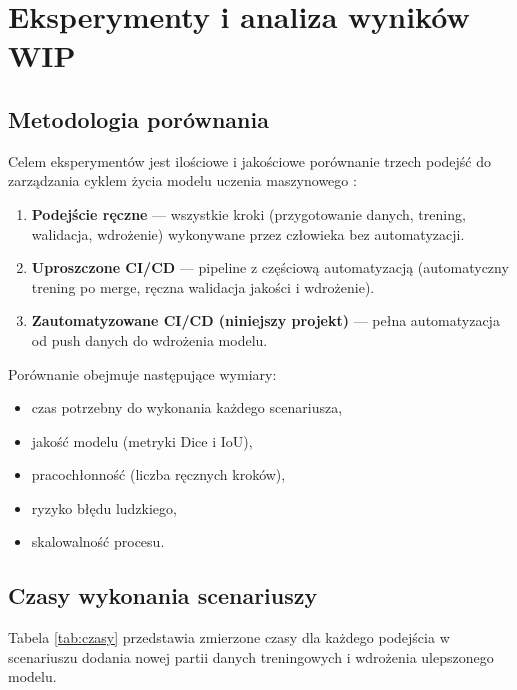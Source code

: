 \section{Eksperymenty i analiza wyników WIP}
\label{sec:Eksperymenty}

\subsection{Metodologia porównania}

Celem eksperymentów jest ilościowe i jakościowe porównanie trzech podejść do zarządzania cyklem życia modelu uczenia maszynowego \cite{kreuzberger2023mlops}:

\begin{enumerate}
  \item \textbf{Podejście ręczne} --- wszystkie kroki (przygotowanie danych, trening, walidacja, wdrożenie) wykonywane przez człowieka bez automatyzacji.
  \item \textbf{Uproszczone CI/CD} --- pipeline z częściową automatyzacją (automatyczny trening po merge, ręczna walidacja jakości i wdrożenie).
  \item \textbf{Zautomatyzowane CI/CD (niniejszy projekt)} --- pełna automatyzacja od push danych do wdrożenia modelu.
\end{enumerate}

Porównanie obejmuje następujące wymiary:
\begin{itemize}
  \item czas potrzebny do wykonania każdego scenariusza,
  \item jakość modelu (metryki Dice i IoU),
  \item pracochłonność (liczba ręcznych kroków),
  \item ryzyko błędu ludzkiego,
  \item skalowalność procesu.
\end{itemize}

\subsection{Czasy wykonania scenariuszy}

Tabela \ref{tab:czasy} przedstawia zmierzone czasy dla każdego podejścia w scenariuszu dodania nowej partii danych treningowych i wdrożenia ulepszonego modelu.


